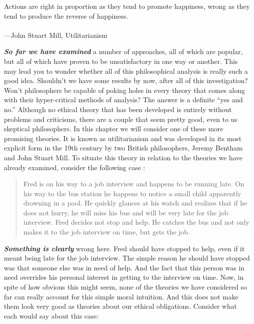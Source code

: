 \documentclass[
  12pt, openany]{book}
\newenvironment{epigraph}%
{
\begin{flushright}
\begin{minipage}{30em}
\begin{flushright}
\itshape
}%
{
\end{flushright}
\end{minipage}
\end{flushright}
\vspace{1em}
}
\theoremstyle{definition}
\theoremstyle{definition}
\theoremstyle{definition}
\theoremstyle{definition}
\theoremstyle{remark}
\begin{document}
\begin{epigraph}
Actions are right in proportion as they tend to promote happiness, wrong as they tend to produce the reverse of happiness.\\
~\\
---John Stuart Mill, Utilitarianism

\end{epigraph}

\textbf{\emph{So far we have examined}} a number of approaches, all of which are popular, but all of which have proven to be unsatisfactory in one way or another. This may lead you to wonder whether all of this philosophical analysis is really such a good idea. Shouldn't we have some results by now, after all of this investigation? Won't philosophers be capable of poking holes in every theory that comes along with their hyper-critical methods of analysis? The answer is a definite ``yes and no.'' Although no ethical theory that has been developed is entirely without problems and criticisms, there are a couple that seem pretty good, even to us skeptical philosophers. In this chapter we will consider one of these more promising theories. It is known as utilitarianism and was developed in its most explicit form in the 19th century by two British philosophers, Jeremy Bentham and John Stuart Mill. To situate this theory in relation to the theories we have already examined, consider the following case :

\begin{quote}
Fred is on his way to a job interview and happens to be running late. On his way to the bus station he happens to notice a small child apparently drowning in a pool. He quickly glances at his watch and realizes that if he does not hurry, he will miss his bus and will be very late for the job interview. Fred decides not stop and help. He catches the bus and not only makes it to the job interview on time, but gets the job.
\end{quote}

\textbf{\emph{Something is clearly}} wrong here. Fred should have stopped to help, even if it meant being late for the job interview. The simple reason he should have stopped was that someone else was in need of help. And the fact that this person was in need overrides his personal interest in getting to the interview on time. Now, in spite of how obvious this might seem, none of the theories we have considered so far can really account for this simple moral intuition. And this does not make them look very good as theories about our ethical obligations. Consider what each would say about this case:
\end{document}
